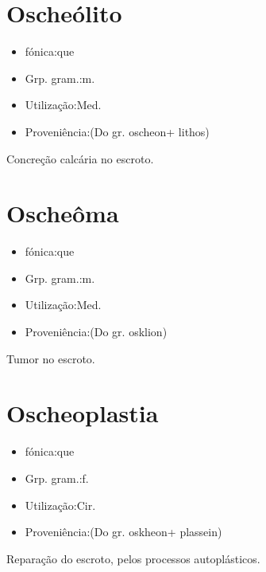 \section{Oscheólito}
\begin{itemize}
\item {fónica:que}
\end{itemize}
\begin{itemize}
\item {Grp. gram.:m.}
\end{itemize}
\begin{itemize}
\item {Utilização:Med.}
\end{itemize}
\begin{itemize}
\item {Proveniência:(Do gr. \textunderscore oscheon\textunderscore  + \textunderscore lithos\textunderscore )}
\end{itemize}
Concreção calcária no escroto.
\section{Oscheôma}
\begin{itemize}
\item {fónica:que}
\end{itemize}
\begin{itemize}
\item {Grp. gram.:m.}
\end{itemize}
\begin{itemize}
\item {Utilização:Med.}
\end{itemize}
\begin{itemize}
\item {Proveniência:(Do gr. \textunderscore osklion\textunderscore )}
\end{itemize}
Tumor no escroto.
\section{Oscheoplastia}
\begin{itemize}
\item {fónica:que}
\end{itemize}
\begin{itemize}
\item {Grp. gram.:f.}
\end{itemize}
\begin{itemize}
\item {Utilização:Cir.}
\end{itemize}
\begin{itemize}
\item {Proveniência:(Do gr. \textunderscore oskheon\textunderscore  + \textunderscore plassein\textunderscore )}
\end{itemize}
Reparação do escroto, pelos processos autoplásticos.
